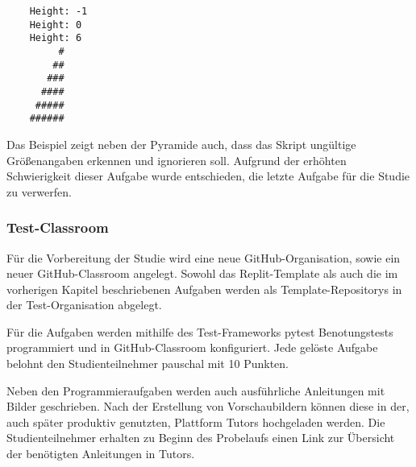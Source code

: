 \begin{lstlisting}
    Height: -1
    Height: 0
    Height: 6
         #
        ##
       ###
      ####
     #####
    ######
\end{lstlisting}

Das Beispiel zeigt neben der Pyramide auch, dass das Skript ungültige
Größenangaben erkennen und ignorieren soll. Aufgrund der erhöhten Schwierigkeit
dieser Aufgabe wurde entschieden, die letzte Aufgabe für die Studie zu
verwerfen.

\subsubsection{Test-Classroom}
Für die Vorbereitung der Studie wird eine neue GitHub-Organisation, sowie ein
neuer GitHub-Classroom angelegt. Sowohl das Replit-Template als auch die im
vorherigen Kapitel beschriebenen Aufgaben werden als Template-Repositorys in
der Test-Organisation abgelegt.

Für die Aufgaben werden mithilfe des Test-Frameworks pytest Benotungstests
programmiert und in GitHub-Classroom konfiguriert. Jede gelöste Aufgabe belohnt
den Studienteilnehmer pauschal mit 10 Punkten.

Neben den Programmieraufgaben werden auch ausführliche Anleitungen mit
Bilder geschrieben. Nach der Erstellung von Vorschaubildern können diese in der,
auch später produktiv genutzten, Plattform Tutors hochgeladen werden. Die
Studienteilnehmer erhalten zu Beginn des Probelaufs einen Link zur Übersicht der
benötigten Anleitungen in Tutors.

